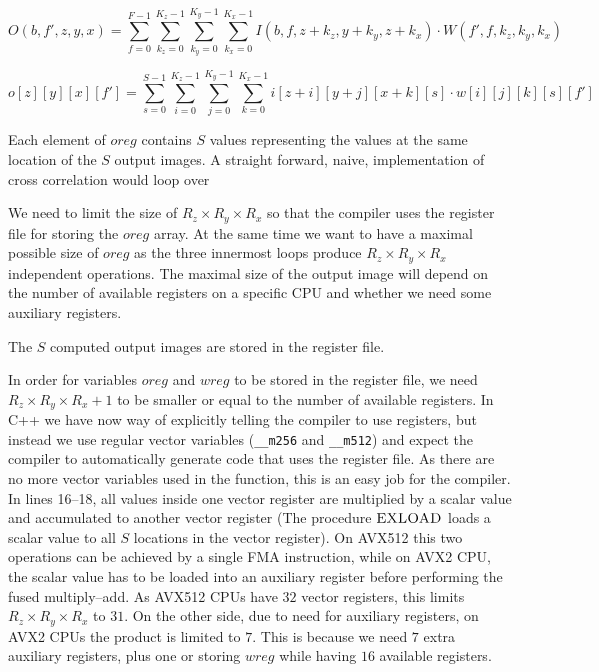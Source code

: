   \begin{equation*}
    O(b,f',z,y,x) = \sum_{f=0}^{F-1} \sum_{k_z=0}^{K_z-1}
    \sum_{k_y=0}^{K_y-1} \sum_{k_x=0}^{K_x-1} I(b,f,z+k_z,y+k_y,z+k_x) \cdot W(f',f,k_z,k_y,k_x)
  \end{equation*}

  {\footnotesize
    \[
    o[z][y][x][f'] = \sum_{s=0}^{S-1} \sum_{i=0}^{K_z-1}
    \sum_{j=0}^{K_y-1} \sum_{k=0}^{K_x-1} i[z+i][y+j][x+k][s] \cdot
    w[i][j][k][s][f']
    \]
  }


  Each element of $oreg$ contains $S$ values representing the values
  at the same location of the $S$ output images.  A straight forward,
  naive, implementation of cross correlation would loop over


We need to limit the
  size of $R_z \times R_y \times R_x$ so that the compiler uses the
  register file for storing the $oreg$ array.  At the same time we
  want to have a maximal possible size of $oreg$ as the three
  innermost loops produce $R_z \times R_y \times R_x$ independent
  operations.  The maximal size of the output image will depend on the
  number of available registers on a specific CPU and whether we need
  some auxiliary registers.



  The $S$ computed output images are stored in the register file.


  In order for variables $oreg$ and $wreg$ to be stored in the
  register file, we need $R_z \times R_y \times R_x + 1$ to be smaller
  or equal to the number of available registers.  In C++ we have now
  way of explicitly telling the compiler to use registers, but instead
  we use regular vector variables (\texttt{\_\_m256} and
  \texttt{\_\_m512}) and expect the compiler to automatically generate
  code that uses the register file.  As there are no more vector
  variables used in the function, this is an easy job for the
  compiler.  In lines 16--18, all values inside one vector register
  are multiplied by a scalar value and accumulated to another vector
  register (The procedure $\textnormal{\scshape EXLOAD}$ loads a scalar value to all
  $S$ locations in the vector register).  On AVX512 this two
  operations can be achieved by a single FMA instruction, while on
  AVX2 CPU, the scalar value has to be loaded into an auxiliary
  register before performing the fused multiply--add.  As AVX512 CPUs
  have $32$ vector registers, this limits $R_z \times R_y \times R_x$
  to $31$.  On the other side, due to need for auxiliary registers, on
  AVX2 CPUs the product is limited to $7$.  This is because we need
  $7$ extra auxiliary registers, plus one or storing $wreg$ while
  having $16$ available registers.

